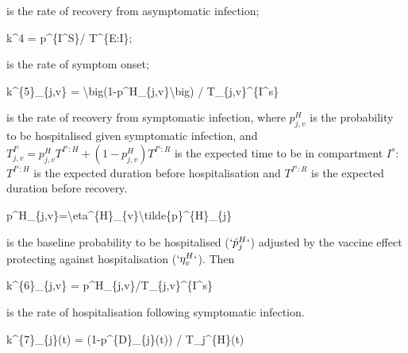 \documentclass[
]{article}
\newenvironment{Shaded}{\begin{snugshade}}{\end{snugshade}}
\newcommand{\NormalTok}[1]{#1}
\begin{document}
is the rate of recovery from asymptomatic infection;

\begin{Shaded}
\begin{Highlighting}[]
\NormalTok{ k\^{}4 = p\^{}\{I\^{}S\}/ T\^{}\{E:I\}; }
\end{Highlighting}
\end{Shaded}

is the rate of symptom onset;

\begin{Shaded}
\begin{Highlighting}[]
\NormalTok{k\^{}\{5\}\_\{j,v\} =  \textbackslash{}big(1{-}p\^{}H\_\{j,v\}\textbackslash{}big) / T\_\{j,v\}\^{}\{I\^{}s\}}
\end{Highlighting}
\end{Shaded}

is the rate of recovery from symptomatic infection, where \(p^H_{j,v}\) is the probability to be hospitalised given symptomatic infection, and \(T_{j,v}^{I^s} = p^H_{j,v}T^{I^s:H} + (1-p^H_{j,v})T^{I^s:R}\) is the expected time to be in compartment \(I^s\): \(T^{I^s:H}\) is the expected duration before hospitalisation and \(T^{I^s:R}\) is the expected duration before recovery.

\begin{Shaded}
\begin{Highlighting}[]
\NormalTok{p\^{}H\_\{j,v\}=\textbackslash{}eta\^{}\{H\}\_\{v\}\textbackslash{}tilde\{p\}\^{}\{H\}\_\{j\}}
\end{Highlighting}
\end{Shaded}

is the baseline probability to be hospitalised (\(`\tilde{p}^{H}_{j}`\)) adjusted by the vaccine effect protecting against hospitalisation (\(`\eta^{H}_{v}`\)). Then

\begin{Shaded}
\begin{Highlighting}[]
\NormalTok{k\^{}\{6\}\_\{j,v\} = p\^{}H\_\{j,v\}/T\_\{j,v\}\^{}\{I\^{}s\}}
\end{Highlighting}
\end{Shaded}

is the rate of hospitalisation following symptomatic infection.

\begin{Shaded}
\begin{Highlighting}[]
\NormalTok{k\^{}\{7\}\_\{j\}(t) = (1{-}p\^{}\{D\}\_\{j\}(t)) / T\_j\^{}\{H\}(t)}
\end{Highlighting}
\end{Shaded}
\end{document}
